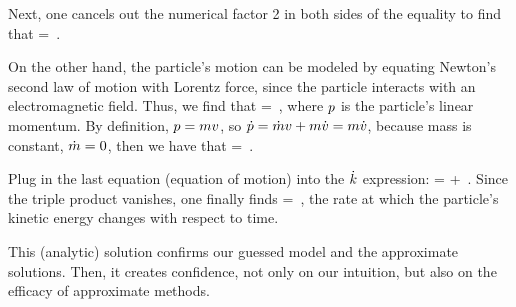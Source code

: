 Next, one cancels out the numerical factor 2 in both sides of the equality to find that
%
\beq
  \ekin = \mass\dt\vel\iprod\vel\,.
\eeq

On the other hand, the particle's motion can be modeled by equating Newton's second law of motion with Lorentz force, since the particle interacts with an electromagnetic field. Thus, we find that
%
\beq
  \dt\mom = \echarge\parth{\efield + \vel\cprod\mfield}\,,
\eeq
%
where $p$ is the particle's linear momentum. By definition, $p = mv$, so $\dot{p} = \dot{m}v + m\dot{v} = m\dot{v}$, because mass is constant, $\dot{m} = 0$, then we have that
%
\beq
  \mass\dt\vel = \echarge\parth{\efield + \vel\cprod\mfield}\,.
\eeq

Plug in the last equation (equation of motion) into the $\dot{k}$ expression:
%
\beq
  \dt\ekin = \echarge\efield\iprod\vel + \echarge\parth{\vel\cprod\mfield}\iprod\vel\,.
\eeq
%
Since the triple product vanishes, one finally finds
%
\beq
  \dt\ekin = \echarge\efield\iprod\vel\,,
\eeq
%
the rate at which the particle's kinetic energy changes with respect to time.

This (analytic) solution confirms our guessed model and the approximate solutions. Then, it creates confidence, not only on our intuition, but also on the efficacy of approximate methods.

